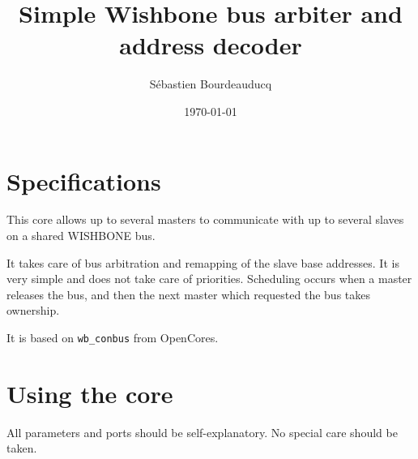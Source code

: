 \documentclass[a4paper,11pt]{article}
\title{Simple Wishbone bus arbiter and address decoder}
\author{S\'ebastien Bourdeauducq}
\date{\today}
\begin{document}
\maketitle{}
\section{Specifications}
This core allows up to several masters to communicate with up to several slaves on a shared WISHBONE bus.

It takes care of bus arbitration and remapping of the slave base addresses. It is very simple and does not take care of priorities. Scheduling occurs when a master releases the bus, and then the next master which requested the bus takes ownership.

It is based on \verb!wb_conbus! from OpenCores.

\section{Using the core}
All parameters and ports should be self-explanatory. No special care should be taken.
\end{document}
